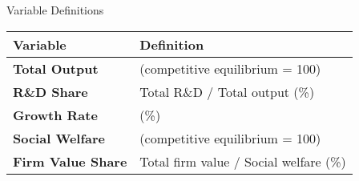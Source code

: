 \documentclass[
  10pt,               %
  aspectratio=169,     %
]{beamer}
\theoremstyle{plain}
\begin{document}
\begin{frame}{Variable Definitions}
  \renewcommand{\arraystretch}{1.5}
  \begin{center}
    \begin{tabular}{@{}ll@{}}
      \toprule
      \textbf{Variable}          & \textbf{Definition}                    \\
      \midrule
      \textbf{Total Output}      & (competitive equilibrium = 100)        \\[1ex]
      \textbf{R\&D Share}        & Total R\&D / Total output (\%)         \\[1ex]
      \textbf{Growth Rate}       & (\%)                                   \\[1ex]
      \textbf{Social Welfare}    & (competitive equilibrium = 100)        \\[1ex]
      \textbf{Firm Value Share}  & Total firm value / Social welfare (\%) \\
      \bottomrule
    \end{tabular}
  \end{center}
\end{frame}
\end{document}
